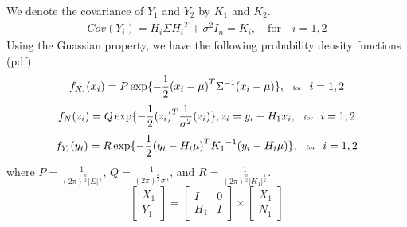 \documentclass{article}
\begin{document}
We denote the covariance of $Y_1$ and $Y_2$ by $K_1$ and $K_2$.
\begin{eqnarray}
Cov(Y_i) = H_i \Sigma {H_i}^T + {\sigma}^2 I_n = K_i,\quad \text{for} \quad i=1,2 
\end{eqnarray}
Using the Guassian property, we have the following probability density functions (pdf)
\begin{equation}
\small{
f_{X_i}(x_i) = P \exp\{-\frac{1}{2}{(x_i-\mu)}^T {\Sigma}^{-1}(x_i-\mu)\},\tiny{\quad\text{for}\quad i=1,2 }}
\end{equation}
\begin{equation}
\small{f_N(z_i) = Q \exp\{-\frac{1}{2}{(z_i)}^T \frac{1}{\sigma^2}(z_i)\}, z_i=y_i-H_1 x_i,\tiny{\quad\text{for}\quad i=1,2 }}
\end{equation}
\begin{equation}
\small{f_{Y_i}(y_i) = R \exp\{-\frac{1}{2}{(y_i-H_i\mu)}^T {K_1}^{-1}(y_i-H_i\mu)\},\tiny{\quad\text{for}\quad i=1,2 } }
\end{equation}
where $P=\frac{1}{({2\pi})^{\frac{n}{2}}{|\Sigma|}^{\frac{1}{2}}}$, $Q=\frac{1}{({2\pi})^{\frac{n}{2}}\sigma^n}$, and $R=\frac{1}{({2\pi})^{\frac{n}{2}} {|K_1|}^{\frac{1}{2}}}$.
\begin{equation}
 \left[\begin{array}{c} X_1 \\ Y_1 \end{array}\right] = 
\begin{bmatrix} I & 0 \\ H_1 & I \end{bmatrix} \times \left[ \begin{array}{c} X_1 \\ N_1 \end{array} \right]      
\end{equation}
\end{document}
